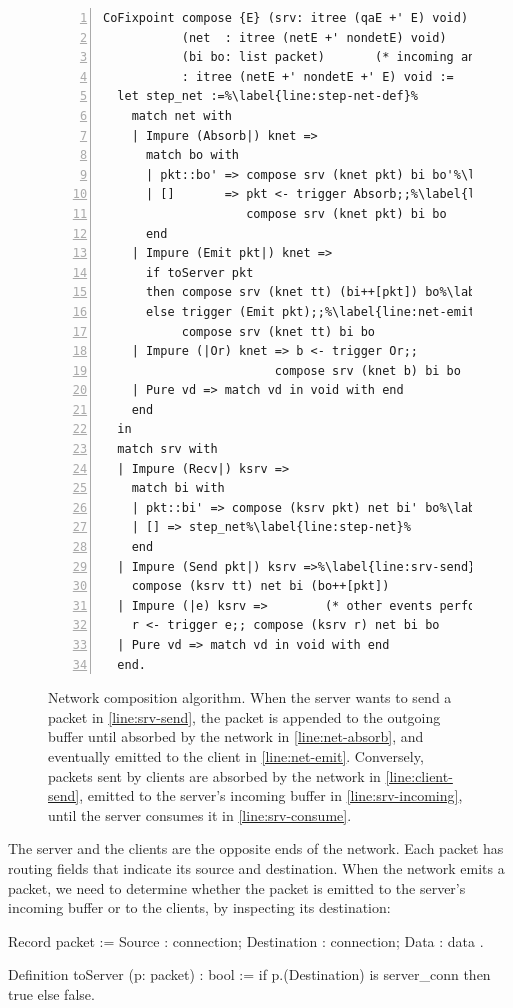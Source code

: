 \begin{figure}
\begin{lstlisting}[style=customcoq,numbers=left,escapechar=\%]
CoFixpoint compose {E} (srv: itree (qaE +' E) void)   (* server  model *)
           (net  : itree (netE +' nondetE) void)      (* network model *)
           (bi bo: list packet)       (* incoming and outgoing buffers *)
           : itree (netE +' nondetE +' E) void :=
  let step_net :=%\label{line:step-net-def}%
    match net with
    | Impure (Absorb|) knet =>
      match bo with
      | pkt::bo' => compose srv (knet pkt) bi bo'%\label{line:net-absorb}%
      | []       => pkt <- trigger Absorb;;%\label{line:client-send}%
                    compose srv (knet pkt) bi bo
      end
    | Impure (Emit pkt|) knet =>
      if toServer pkt
      then compose srv (knet tt) (bi++[pkt]) bo%\label{line:srv-incoming}%
      else trigger (Emit pkt);;%\label{line:net-emit}%
           compose srv (knet tt) bi bo
    | Impure (|Or) knet => b <- trigger Or;;
                        compose srv (knet b) bi bo
    | Pure vd => match vd in void with end
    end
  in
  match srv with
  | Impure (Recv|) ksrv =>
    match bi with
    | pkt::bi' => compose (ksrv pkt) net bi' bo%\label{line:srv-consume}%
    | [] => step_net%\label{line:step-net}%
    end
  | Impure (Send pkt|) ksrv =>%\label{line:srv-send}%
    compose (ksrv tt) net bi (bo++[pkt])
  | Impure (|e) ksrv =>        (* other events performed by the server *)
    r <- trigger e;; compose (ksrv r) net bi bo
  | Pure vd => match vd in void with end
  end.
\end{lstlisting}
\caption[Network composition algorithm]{Network composition algorithm.  When the
  server wants to send a packet in \autoref{line:srv-send}, the packet is
  appended to the outgoing buffer until absorbed by the network in
  \autoref{line:net-absorb}, and eventually emitted to the client in
  \autoref{line:net-emit}.  Conversely, packets sent by clients are absorbed by
  the network in \autoref{line:client-send}, emitted to the server's incoming
  buffer in \autoref{line:srv-incoming}, until the server consumes it in
  \autoref{line:srv-consume}.}
\label{fig:net-compose-code}
\end{figure}

The server and the clients are the opposite ends of the network.  Each packet
has routing fields that indicate its source and destination.  When the network
emits a packet, we need to determine whether the packet is emitted to the
server's incoming buffer or to the clients, by inspecting its destination:
\begin{coq}
  Record packet := {
    Source      : connection;
    Destination : connection;
    Data        : data
  }.

  Definition toServer (p: packet) : bool :=
    if p.(Destination) is server_conn then true else false.
\end{coq}

